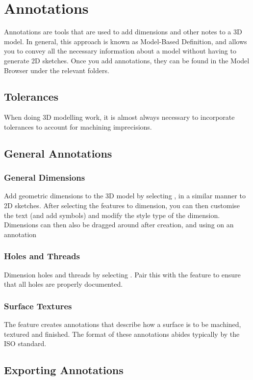 \chapter{Annotations}

Annotations are tools that are used to add dimensions and other notes to a 3D model. In general, this approach is known as Model-Based Definition, and allows you to convey all the necessary information about a model without having to generate 2D sketches. Once you add annotations, they can be found in the Model Browser under the relevant folders.

\section{Tolerances}

When doing 3D modelling work, it is almost always necessary to incorporate tolerances to account for machining imprecisions.

\section{General Annotations}

\subsection{General Dimensions}

Add geometric dimensions to the 3D model by selecting , in a similar manner to 2D sketches. After selecting the features to dimension, you can then customise the text (and add symbols) and modify the style type of the dimension. Dimensions can then also be dragged around after creation, and using  on an annotation 

\subsection{Holes and Threads}

Dimension holes and threads by selecting . Pair this with the  feature to ensure that all holes are properly documented.

\subsection{Surface Textures}

The  feature creates annotations that describe how a surface is to be machined, textured and finished. The format of these annotations abides typically by the ISO standard.

\section{Exporting Annotations}
